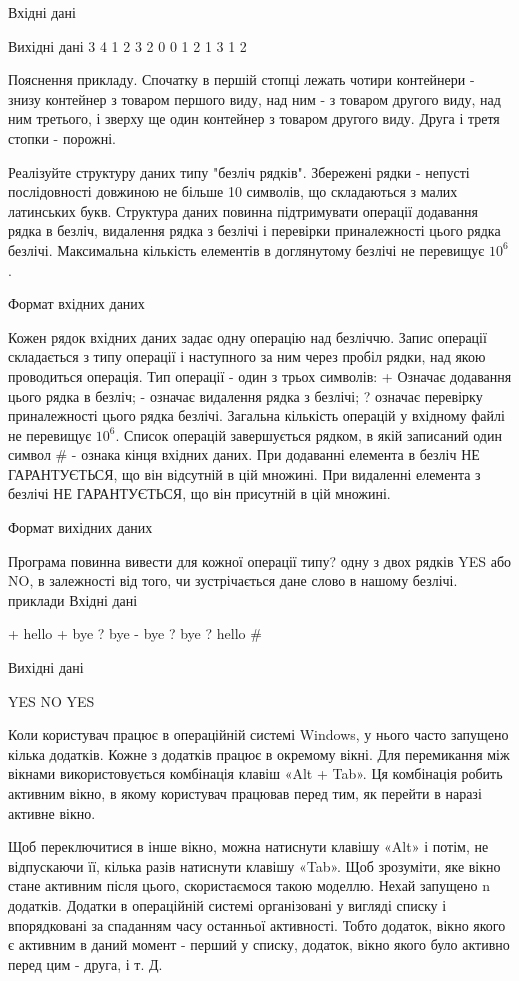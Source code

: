 \documentclass[]{article}
\begin{document}
Вхідні дані


Вихідні дані
3
4 1 2 3 2
0
0 1 2
1 3
1 2

Пояснення прикладу. Спочатку в першій стопці лежать чотири контейнери - знизу контейнер з товаром першого виду, над ним - з товаром другого виду, над ним третього, і зверху ще один контейнер з товаром другого виду. Друга і третя стопки - порожні.

Реалізуйте структуру даних типу "безліч рядків". Збережені рядки - непусті послідовності довжиною не більше 10 символів, що складаються з малих латинських букв.
Структура даних повинна підтримувати операції додавання рядка в безліч, видалення рядка з безлічі і перевірки приналежності цього рядка безлічі.
Максимальна кількість елементів в доглянутому безлічі не перевищує $10^6$.

Формат вхідних даних

Кожен рядок вхідних даних задає одну операцію над безліччю. Запис операції складається з типу операції і наступного за ним через пробіл рядки, над якою проводиться операція.
Тип операції - один з трьох символів:
    + Означає додавання цього рядка в безліч;
    - означає видалення рядка з безлічі;
    ? означає перевірку приналежності цього рядка безлічі.
Загальна кількість операцій у вхідному файлі не перевищує $10^6$. Список операцій завершується рядком, в якій записаний один символ 
\# - ознака кінця вхідних даних.
При додаванні елемента в безліч НЕ ГАРАНТУЄТЬСЯ, що він відсутній в цій множині. При видаленні елемента з безлічі НЕ ГАРАНТУЄТЬСЯ, що він присутній в цій множині.

Формат вихідних даних

Програма повинна вивести для кожної операції типу? одну з двох рядків YES або NO, в залежності від того, чи зустрічається дане слово в нашому безлічі.
приклади
Вхідні дані

+ hello
+ bye
? bye
- bye
? bye
? hello
\#

Вихідні дані

YES
NO
YES


Коли користувач працює в операційній системі Windows, у нього часто запущено кілька додатків. Кожне з додатків працює в окремому вікні. Для перемикання між вікнами використовується комбінація клавіш «Alt + Tab». Ця комбінація робить активним вікно, в якому користувач працював перед тим, як перейти в наразі активне вікно.

Щоб переключитися в інше вікно, можна натиснути клавішу «Alt» і потім, не відпускаючи її, кілька разів натиснути клавішу «Tab». Щоб зрозуміти, яке вікно стане активним після цього, скористаємося такою моделлю. Нехай запущено n додатків. Додатки в операційній системі організовані у вигляді списку і впорядковані за спаданням часу останньої активності. Тобто додаток, вікно якого є активним в даний момент - перший у списку, додаток, вікно якого було активно перед цим - друга, і т. Д.
\end{document}
